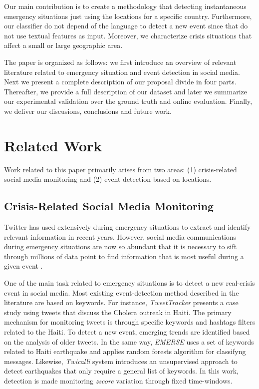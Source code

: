 \documentclass[sigconf]{acmart}
\begin{document}
Our main contribution is to create a methodology that detecting instantaneous emergency situations just using the locations for a specific country. Furthermore, our classifier do not depend of the language to detect a new event since that do not use textual features as input. Moreover, we characterize crisis situations that affect a small or large geographic area.

The paper is organized as follows: we first introduce an overview of relevant literature related to emergency situation and event detection in social media. Next we present a complete description of our proposal divide in four parts. Thereafter, we provide a full description of our dataset and later we summarize our experimental validation over the ground truth and online evaluation. Finally, we deliver our discusions, conclusions and future work.



\section{Related Work}

Work related to this paper primarily arises from two areas: (1) crisis-related social media monitoring and (2) event detection based on locations.

\subsection{Crisis-Related Social Media Monitoring}

Twitter has used extensively during emergency situations to extract and identify relevant information in recent years. However, social media communications during emergency situations are now so abundant that it is necessary to sift through millions of data point to find information that is most useful during a given event \cite{imran2015processing}.

One of the main task related to emergency situations is to detect a new real-crisis event in social media. Most existing event-detection method described in the literature are based on keywords. For instance, \textit{TweetTracker} \cite{kumar2011tweettracker} presents a case study using tweets that discuss the Cholera outreak in Haiti. The primary mechanism for monitoring tweets is through specific keywords and hashtags filters related to the Haiti. To detect a new event, emerging trends are identified based on the analysis of older tweets. In the same way, \textit{EMERSE} \cite{caragea2011classifying} uses a set of keywords related to Haiti earthquake and applies random forests algorithm for classifyng messages. Likewise, \textit{Twicalli} system \cite{maldonado2017} introduces an unsupervised approach to detect earthquakes that only require a general list of keywords. In this work, detection is made monitoring \textit{zscore} variation through fixed time-windows. 
\end{document}
